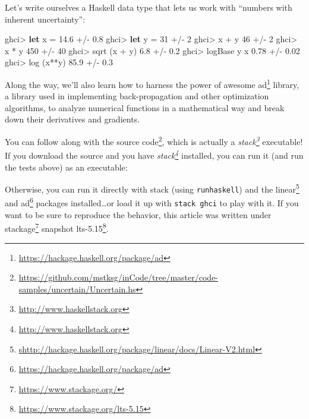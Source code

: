 \documentclass[]{article}
\newenvironment{Shaded}{}{}
\newcommand{\DecValTok}[1]{\textcolor[rgb]{0.25,0.63,0.44}{#1}}
\newcommand{\ExtensionTok}[1]{#1}
\newcommand{\FloatTok}[1]{\textcolor[rgb]{0.25,0.63,0.44}{#1}}
\newcommand{\FunctionTok}[1]{\textcolor[rgb]{0.02,0.16,0.49}{#1}}
\newcommand{\KeywordTok}[1]{\textcolor[rgb]{0.00,0.44,0.13}{\textbf{#1}}}
\newcommand{\NormalTok}[1]{#1}
\renewcommand{\href}[2]{#2\footnote{\url{#1}}}
\begin{document}
Let's write ourselves a Haskell data type that lets us work with ``numbers with
inherent uncertainty'':

\begin{Shaded}
\begin{Highlighting}[]
\NormalTok{ghci}\FunctionTok{>} \KeywordTok{let}\NormalTok{ x }\FunctionTok{=} \FloatTok{14.6} \FunctionTok{+/-} \FloatTok{0.8}
\NormalTok{ghci}\FunctionTok{>} \KeywordTok{let}\NormalTok{ y }\FunctionTok{=} \DecValTok{31}   \FunctionTok{+/-} \DecValTok{2}
\NormalTok{ghci}\FunctionTok{>}\NormalTok{ x }\FunctionTok{+}\NormalTok{ y}
\DecValTok{46} \FunctionTok{+/-} \DecValTok{2}
\NormalTok{ghci}\FunctionTok{>}\NormalTok{ x }\FunctionTok{*}\NormalTok{ y}
\DecValTok{450} \FunctionTok{+/-} \DecValTok{40}
\NormalTok{ghci}\FunctionTok{>}\NormalTok{ sqrt (x }\FunctionTok{+}\NormalTok{ y)}
\FloatTok{6.8} \FunctionTok{+/-} \FloatTok{0.2}
\NormalTok{ghci}\FunctionTok{>}\NormalTok{ logBase y x}
\FloatTok{0.78} \FunctionTok{+/-} \FloatTok{0.02}
\NormalTok{ghci}\FunctionTok{>}\NormalTok{ log (x}\FunctionTok{**}\NormalTok{y)}
\FloatTok{85.9} \FunctionTok{+/-} \FloatTok{0.3}
\end{Highlighting}
\end{Shaded}

Along the way, we'll also learn how to harness the power of awesome
\href{https://hackage.haskell.org/package/ad}{ad} library, a library used in
implementing back-propagation and other optimization algorithms, to analyze
numerical functions in a mathematical way and break down their derivatives and
gradients.

You can follow along with
\href{https://github.com/mstksg/inCode/tree/master/code-samples/uncertain/Uncertain.hs}{the
source code}, which is actually a
\emph{\href{http://www.haskellstack.org}{stack}} executable! If you download the
source and you have \emph{\href{http://www.haskellstack.org}{stack}} installed,
you can run it (and run the tests above) as an executable:

\begin{Shaded}
\end{Shaded}

Otherwise, you can run it directly with stack (using \texttt{runhaskell}) and
the
\href{shttp://hackage.haskell.org/package/linear/docs/Linear-V2.html}{linear}
and \href{https://hackage.haskell.org/package/ad}{ad} packages
installed\ldots{}or load it up with \texttt{stack\ ghci} to play with it. If you
want to be sure to reproduce the behavior, this article was written under
\href{https://www.stackage.org/}{stackage} snapshot
\href{https://www.stackage.org/lts-5.15}{lts-5.15}.
\end{document}
